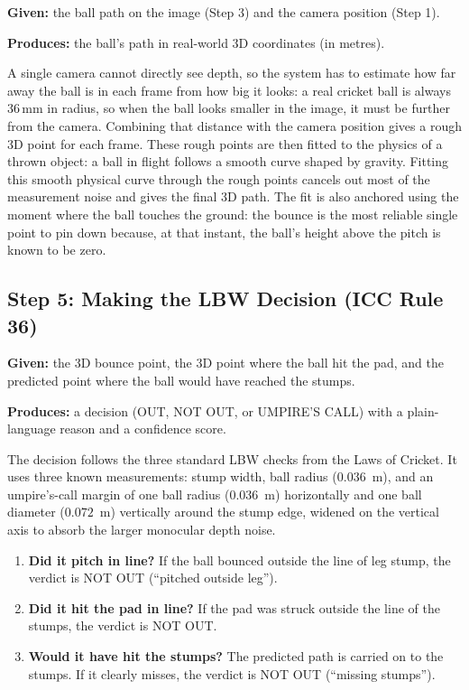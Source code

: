 \documentclass[12pt,a4paper]{report}
\begin{document}
\textbf{Given:} the ball path on the image (Step 3) and the camera position (Step 1).

\textbf{Produces:} the ball's path in real-world 3D coordinates (in metres).

A single camera cannot directly see depth, so the system has to estimate how far away the ball is in each frame from how big it looks: a real cricket ball is always $36$\,mm in radius, so when the ball looks smaller in the image, it must be further from the camera. Combining that distance with the camera position gives a rough 3D point for each frame. These rough points are then fitted to the physics of a thrown object: a ball in flight follows a smooth curve shaped by gravity. Fitting this smooth physical curve through the rough points cancels out most of the measurement noise and gives the final 3D path. The fit is also anchored using the moment where the ball touches the ground: the bounce is the most reliable single point to pin down because, at that instant, the ball's height above the pitch is known to be zero.

\subsection{Step 5: Making the LBW Decision (ICC Rule 36)}

\textbf{Given:} the 3D bounce point, the 3D point where the ball hit the pad, and the predicted point where the ball would have reached the stumps.

\textbf{Produces:} a decision (OUT, NOT OUT, or UMPIRE'S CALL) with a plain-language reason and a confidence score.

The decision follows the three standard LBW checks from the Laws of Cricket. It uses three known measurements: stump width, ball radius ($0.036$~m), and an umpire's-call margin of one ball radius ($0.036$~m) horizontally and one ball diameter ($0.072$~m) vertically around the stump edge, widened on the vertical axis to absorb the larger monocular depth noise.

\begin{enumerate}
    \item \textbf{Did it pitch in line?} If the ball bounced outside the line of leg stump, the verdict is NOT OUT (``pitched outside leg'').
    \item \textbf{Did it hit the pad in line?} If the pad was struck outside the line of the stumps, the verdict is NOT OUT.
    \item \textbf{Would it have hit the stumps?} The predicted path is carried on to the stumps. If it clearly misses, the verdict is NOT OUT (``missing stumps'').
\end{enumerate}
\end{document}
